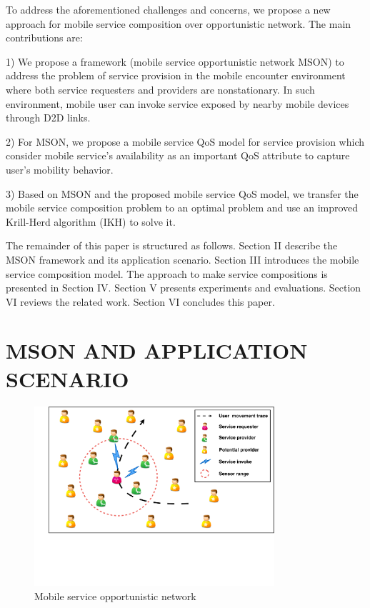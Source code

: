 \documentclass[10pt,journal,compsoc]{IEEEtran}
\begin{document}
To address the aforementioned challenges and concerns, we propose a new approach for mobile service composition over opportunistic network. The main contributions are:

1) We propose a framework (mobile service opportunistic network MSON) to address the problem of service provision in the mobile encounter environment where both service requesters and providers are nonstationary. In such environment, mobile user can invoke service exposed by nearby mobile devices through D2D links.

2) For MSON, we propose a mobile service QoS model for service provision which consider mobile service's availability as an important QoS attribute to capture user's mobility behavior.

3) Based on MSON and the proposed mobile service QoS model, we transfer the mobile service composition problem to an optimal problem and use an improved Krill-Herd algorithm (IKH) to solve it. 

The remainder of this paper is structured as follows. Section II describe the MSON framework and its application scenario. Section III introduces the mobile service composition model. The approach to make service compositions is presented in Section IV. Section V presents experiments and evaluations. Section VI reviews the related work. Section VI concludes this paper.

\section{MSON AND APPLICATION SCENARIO}

\begin{figure}[!t]
\centering
\includegraphics[width=3.5in]{./img/pic2.pdf}
\caption{Mobile service opportunistic network}
\label{fig_mson}
\end{figure}
\end{document}
